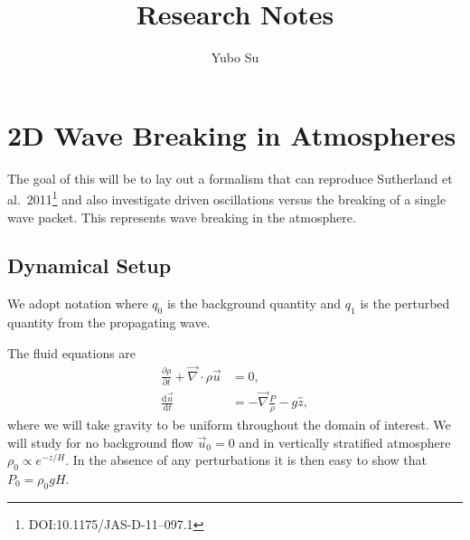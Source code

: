 \documentclass[11pt,
        usenames, %
        dvipsnames %
    ]{report}
\newcommand*{\rd}[2]{\frac{\mathrm{d}#1}{\mathrm{d}#2}}
\newcommand*{\pd}[2]{\frac{\partial#1}{\partial#2}}
\begin{document}
\def\Snospace~{\S{}} %
\renewcommand*{\sectionautorefname}{\Snospace}
\renewcommand*{\appendixautorefname}{\Snospace}
\renewcommand*{\figureautorefname}{Fig.}
\renewcommand*{\equationautorefname}{Eq.}
\renewcommand*{\tableautorefname}{Tab.}

\onehalfspacing

\pagestyle{fancy}
\cfoot{\thepage/\pageref{LastPage}}

\title{Research Notes}
\author{Yubo Su}

\maketitle

\tableofcontents

\newpage

\chapter{2D Wave Breaking in Atmospheres}

The goal of this will be to lay out a formalism that can reproduce Sutherland et
al.~2011\footnote{DOI:10.1175/JAS-D-11--097.1} and also investigate driven
oscillations versus the breaking of a single wave packet. This represents wave
breaking in the atmosphere.

\section{Dynamical Setup}

We adopt notation where $q_0$ is the background quantity and $q_1$ is the
perturbed quantity from the propagating wave.

The fluid equations are
\begin{subequations}\label{se:fl_eq}
    \begin{align}
        \pd{\rho}{t} + \vec{\nabla} \cdot \rho \vec{u} &= 0,
            \label{eq:fl_eq.cont}\\
        \rd{\vec{u}}{t} &= -\vec{\nabla}\frac{P}{\rho} - g\hat{z},
            \label{eq:fl_eq.mom}
    \end{align}
\end{subequations}
where we will take gravity to be uniform throughout the domain of interest. We
will study for no background flow $\vec{u}_0 = 0$ and in vertically stratified
atmosphere $\rho_0 \propto e^{-z/H}$. In the absence of any perturbations it is
then easy to show that $P_0 = \rho_0 g H$.
\end{document}
